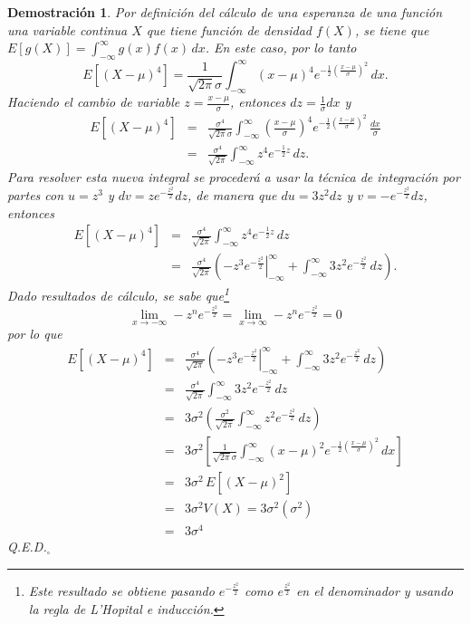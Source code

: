 \documentclass[a4paper,11pt]{article}
\theoremstyle{teoremas}
\theoremstyle{ejemplos}
\theoremstyle{definiciones}
\theoremstyle{lemas}
\newtheorem*{demostracion}{Demostraci\'on}
\begin{document}
\begin{demostracion}
 Por definici\'on del c\'alculo de una esperanza de una funci\'on una variable continua $X$ que tiene funci\'on de densidad $f(X)$, se tiene que $E\left[ g(X) \right] = \int_{-\infty}^{\infty}g(x)f(x)\, dx$.
 En este caso, por lo tanto
 \begin{equation*}
  E\left[ (X - \mu)^4 \right] = \frac{1}{\sqrt{2\pi}\sigma} \int_{-\infty}^{\infty} (x-\mu)^4 e^{-\frac{1}{2}\left( \frac{x - \mu}{\sigma} \right)^2} \, dx.
 \end{equation*}
 Haciendo el cambio de variable $z = \frac{x-\mu}{\sigma}$, entonces $dz = \frac{1}{\sigma}dx$ y 
 \begin{eqnarray*}
  E\left[ (X - \mu)^4 \right] & = & \frac{\sigma^4}{\sqrt{2\pi}\sigma} \int_{-\infty}^{\infty} \left( \frac{x - \mu}{\sigma} \right)^4 e^{-\frac{1}{2}\left( \frac{x - \mu}{\sigma} \right)^2} \, \frac{dx}{\sigma} \\ 
    & = & \frac{\sigma^4}{\sqrt{2\pi}} \int_{-\infty}^{\infty} z^4 e^{-\frac{1}{2}z}\, dz.
 \end{eqnarray*}
 Para resolver esta nueva integral se proceder\'a a usar la t\'ecnica de integraci\'on por partes con $u = z^3$ y $dv = ze^{-\frac{z^2}{2}}dz$, de manera que $du = 3z^2 dz$ y $v = -e^{-\frac{z^2}{2}} dz$, entonces
 \begin{eqnarray*}
  E\left[ (X - \mu)^4 \right] & = & \frac{\sigma^4}{\sqrt{2\pi}} \int_{-\infty}^{\infty} z^4 e^{-\frac{1}{2}z}\, dz \\
    & = & \frac{\sigma^4}{\sqrt{2\pi}} \left( \left. -z^3e^{-\frac{z^2}{2}} \right|_{-\infty}^{\infty} + \int_{-\infty}^{\infty} 3z^2 e^{-\frac{z^2}{2}}\, dz \right).
 \end{eqnarray*}
 Dado resultados de c\'alculo, se sabe que\footnote{Este resultado se obtiene pasando $e^{-\frac{z^2}{2}}$ como $e^{\frac{z^2}{2}}$ en el denominador y usando la regla de L'Hopital e inducci\'on.} 
 \begin{equation*}
  \lim_{x \to -\infty} - z^n e^{-\frac{z^2}{2}} = \lim_{x \to \infty} - z^n e^{-\frac{z^2}{2}} = 0
 \end{equation*}
 por lo que 
 \begin{eqnarray*}
  E\left[ (X - \mu)^4 \right] & = & \frac{\sigma^4}{\sqrt{2\pi}} \left( \left. -z^3e^{-\frac{z^2}{2}} \right|_{-\infty}^{\infty} + \int_{-\infty}^{\infty} 3z^2 e^{-\frac{z^2}{2}}\, dz \right) \\
    & = & \frac{\sigma^4}{\sqrt{2\pi}} \int_{-\infty}^{\infty} 3z^2 e^{-\frac{z^2}{2}}\, dz \\
    & = & 3\sigma^2 \left( \frac{\sigma^2}{\sqrt{2\pi}} \int_{-\infty}^{\infty} z^2 e^{-\frac{z^2}{2}}\, dz \right) \\
    & = & 3\sigma^2\left[ \frac{1}{\sqrt{2\pi}\sigma} \int_{-\infty}^{\infty} (x-\mu)^2 e^{-\frac{1}{2}\left( \frac{x - \mu}{\sigma} \right)^2} \, dx \right] \\ 
    & = & 3\sigma^2\, E\left[ (X-\mu)^2 \right] \\ 
    & = & 3\sigma^2V(X) = 3\sigma^2\left( \sigma^2 \right) \\
    & = & 3\sigma^4
 \end{eqnarray*}
 Q.E.D.${}_{\square}$
\end{demostracion}
\end{document}

